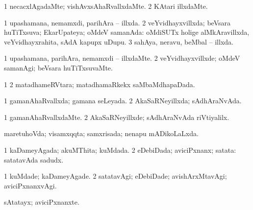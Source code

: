 {{\bentry
{} 
\gl{\nA}
\expl{}
\bmng
{} 
\emng
\eentry

\bentry
{} 
\gl{\kirxvi}
\expl{}
\bmng
\bnum
\num{1} necacxlAgadaMte; vishAvxsAhaRvallxdaMte. 
\num{2} KAtari illxdaMte. 
\enum
\emng
\eentry

\bentry
{} 
\gl{\gu}
\expl{}
\bmng
\bnum
\num{1} upashamana, nemamxdi, parihAra -- illxda. 
\num{2} veYvidhayxvillxda; beVsara huTiTxsuva; EkarUpateya; oMdeV samanAda:  oMdiSUTx holige alMkAravillxda, veYvidhayxrahita, sAdA kapupx uDupu. 
\num{3} sahAya, neravu, beMbal -- illxda. 
\enum
\emng
\eentry

\bentry
{} 
\gl{\kirxvi}
\expl{}
\bmng
\bnum
\num{1} upashamana, parihAra, nemamxdi -- illxdaMte. 
\num{2} veYvidhayxvillxde; oMdeV samanAgi; beVsara huTiTxsuvaMte. 
\enum
\emng
\eentry

\bentry
{} 
\gl{\gu}
\expl{}
\bmng
\bnum
\num{1}  
\num{2} matadhameRVtara; matadhamaRkekx saMbaMdhapaDada. 
\enum
\emng
\eentry

\bentry
{} 
\gl{\gu}
\expl{}
\bmng
\bnum
\num{1} gamanAhaRvallxda; gamana seLeyada. 
\num{2} AkaSaRNeyillxda; sAdhAraNvAda. 
\enum
\emng
\eentry

\bentry
{} 
\gl{\kirxvi}
\expl{}
\bmng
\bnum
\num{1} gamanAhaRvallxdaMte. 
\num{2} AkaSaRNeyillxde; sAdhAraNvAda riVtiyalilx. 
\enum
\emng
\eentry

\bentry
{} 
\gl{\gu}
\expl{}
\bmng
maretuhoVda; visamxqqta; samxrisada; nenapu mADikoLaLxda. 
\emng
\eentry

\bentry
{} 
\gl{\gu}
\expl{}
\bmng
\bnum
\num{1} kaDameyAgada; akuMThita; kuMdada. 
\num{2} eDebiDada; aviciPxnanx; satata:  satatavAda sadudx. 
\enum
\emng
\eentry

\bentry
{} 
\gl{\kirxvi}
\expl{}
\bmng
\bnum
\num{1} kuMdade; kaDameyAgade. 
\num{2} satatavAgi; eDebiDade; avishArxMtavAgi; aviciPxnanxvAgi. 
\enum
\emng
\eentry

\bentry
{} 
\gl{\nA}
\expl{}
\bmng
sAtatayx; aviciPxnanxte. 
\emng
\eentry

}}
